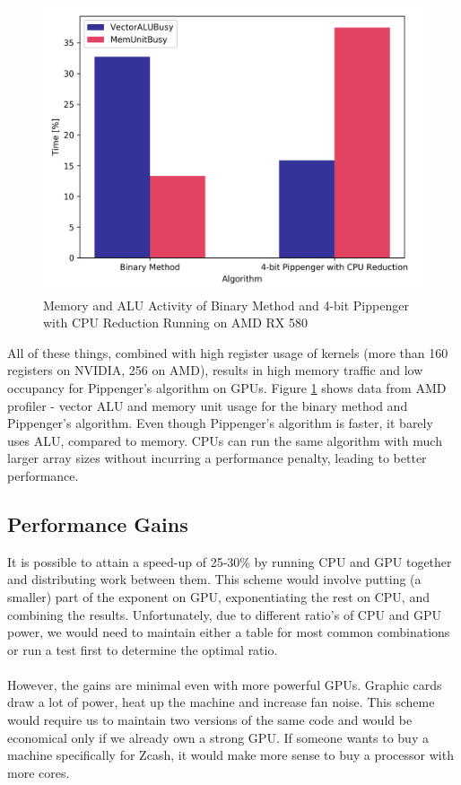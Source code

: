 \begin{figure}[h]
    \includegraphics[width=\linewidth]{Figures/profiler.png}
    \caption{Memory and ALU Activity of Binary Method and 4-bit Pippenger with CPU Reduction Running on AMD RX 580}
    \label{fig:profiler}
\end{figure}

\noindent All of these things, combined with high register usage of kernels (more than 160 registers on NVIDIA, 256 on AMD), results in high memory traffic and low occupancy for Pippenger's algorithm on GPUs. Figure \ref{fig:profiler} shows data from AMD profiler - vector ALU and memory unit usage for the binary method and Pippenger's algorithm. Even though Pippenger's algorithm is faster, it barely uses ALU, compared to memory. CPUs can run the same algorithm with much larger array sizes without incurring a performance penalty, leading to better performance.

\subsection{Performance Gains}

It is possible to attain a speed-up of 25-30\% by running CPU and GPU together and distributing work between them. This scheme would involve putting (a smaller) part of the exponent on GPU, exponentiating the rest on CPU, and combining the results. Unfortunately, due to different ratio's of CPU and GPU power, we would need to maintain either a table for most common combinations or run a test first to determine the optimal ratio.\\
\\
However, the gains are minimal even with more powerful GPUs. Graphic cards draw a lot of power, heat up the machine and increase fan noise. This scheme would require us to maintain two versions of the same code and would be economical only if we already own a strong GPU. If someone wants to buy a machine specifically for Zcash, it would make more sense to buy a processor with more cores.